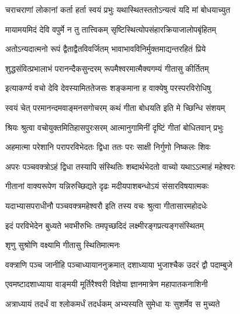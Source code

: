 \twolineshloka
{चराचराणां लोकानां कर्ता हर्ता स्वयं प्रभुः}
{यथास्थितस्ततोऽन्यत्वं यदि मां बोधयाच्युत} %


\twolineshloka
{मायामयमिदं देवि वपुर्मे न तु तात्त्विकम्}
{सृष्टिस्थित्योपसंहारक्रियाजालोपबृंहितम्} %

\twolineshloka
{अतोऽन्यदात्मनो रूपं द्वैताद्वैतविवर्जितम्}
{भावाभावविनिर्मुक्तमाद्यन्तरहितं प्रिये} %

\twolineshloka
{शुद्धसंवित्प्रभालाभं परानन्दैकसुन्दरम्}
{रूपमैश्वरमात्मैक्यगम्यं गीतासु कीर्तितम्} %

\twolineshloka
{इत्याकर्ण्य वचो देवि देवस्यामिततेजसः}
{शङ्कमाना ह वाक्येषु परस्परविरोधिषु} %

\twolineshloka
{स्वयं चेत् परमानन्दमवाङ्मनसगोचरम्}
{कथं गीता बोधयति इति मे च्छिन्धि संशयम्} %


\twolineshloka
{श्रियः श्रुत्वा वचोयुक्तमितिहासपुरःसरम्}
{आत्मानुगामिनीं दृष्टिं गीतां बोधितवान् प्रभुः} %

\twolineshloka
{अहमात्मा परेशानि परापरविभेदतः}
{द्विधा ततः परः साक्षी निर्गुणो निष्कलः शिवः} %

\twolineshloka
{अपरः पञ्चवक्त्रोऽहं द्विधा तस्यापि संस्थितिः}
{शब्दार्थभेदतो वाच्यो यथाऽऽत्माहं महेश्वरः} %

\twolineshloka
{गीतानां वाक्यरूपेण यन्निरुच्छिद्यते दृढः}
{मदीयपाशबन्धोऽयं संसारविषयात्मकः} %

\twolineshloka
{यदाभ्यासपराधीनौ पञ्चवक्त्रमहेश्वरौ}
{इति तस्य वचः श्रुत्वा गीतासारमहोदधेः} %

\twolineshloka
{इदं परविभेदेन बुध्यते भवभीरुभिः}
{तमपृच्छदिदं लक्ष्मीरङ्गप्रत्यङ्गसंस्थितम्} %



\onelineshloka
{शृणु सुश्रोणि वक्ष्यामि गीतासु स्थितिमात्मनः} %

\twolineshloka
{वक्त्राणि पञ्च जानीहि पञ्चाध्यायाननुक्रमात्}
{दशाध्याया भुजाश्चैक उदरं द्वौ पदाम्बुजे} %

\twolineshloka
{एवमष्टादशाध्याया वाङ्मयी मूर्तिरैश्वरी}
{विज्ञेया ज्ञानमात्रेण महापातकनाशिनी} %

\twolineshloka
{अत्राध्यायं तदर्धं वा श्लोकमर्धं तदर्धकम्}
{अभ्यस्यति सुमेधा यः सुशर्मेव स मुच्यते} %


